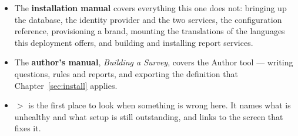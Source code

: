 \documentclass[11pt, a4paper]{article}
\begin{document}
\begin{itemize}
  \item The \textbf{installation manual} covers everything this one does not: bringing up the
        database, the identity provider and the two services, the configuration reference,
        provisioning a brand, mounting the translations of the languages this deployment
        offers, and building and installing report services.
  \item The \textbf{author's manual}, \emph{Building a Survey}, covers the Author tool — writing
        questions, rules and reports, and exporting the definition that Chapter~\ref{sec:install} applies.
  \item {} $>$  is the first place to look when something is wrong here.
        It names what is unhealthy and what setup is still outstanding, and links to the screen
        that fixes it.
\end{itemize}
\end{document}
